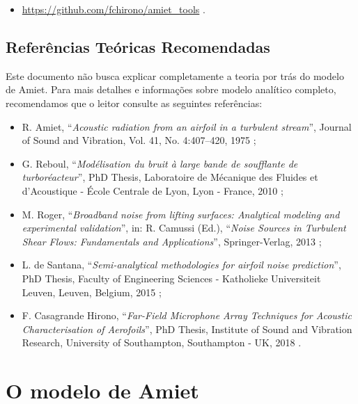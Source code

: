 \documentclass[a4paper, 11pt, twoside]{article}
\begin{document}
\begin{itemize}
	\item \url{https://github.com/fchirono/amiet_tools} .
\end{itemize}


\subsection{Referências Teóricas Recomendadas}

Este documento não busca explicar completamente a teoria por trás do modelo de Amiet. Para mais detalhes e informações sobre modelo analítico completo, recomendamos que o leitor consulte as seguintes referências:

\begin{itemize}
	\item R. Amiet, ``\emph{Acoustic radiation from an airfoil in a turbulent stream}'', Journal of Sound and Vibration, Vol. 41, No. 4:407–420, 1975 \cite{Amiet75};
	
	\item G. Reboul, ``\emph{Modélisation du bruit à large bande de soufflante de turboréacteur}'', PhD Thesis, Laboratoire de Mécanique des Fluides et d’Acoustique - École Centrale de Lyon, Lyon - France, 2010 \cite{Reboul10};
	
	\item M. Roger, ``\emph{Broadband noise from lifting surfaces: Analytical modeling and experimental validation}'', in: R. Camussi (Ed.), ``\emph{Noise Sources in Turbulent Shear Flows: Fundamentals and Applications}'', Springer-Verlag, 2013 \cite{Roger13};
	
	\item L. de Santana, ``\emph{Semi-analytical methodologies for airfoil noise prediction}'', PhD Thesis, Faculty of Engineering Sciences - Katholieke Universiteit Leuven, Leuven, Belgium, 2015 \cite{deSantana2015};
	
	\item F. Casagrande Hirono, ``\emph{Far-Field Microphone Array Techniques for Acoustic Characterisation of Aerofoils}'', PhD Thesis, Institute of Sound and Vibration Research, University of Southampton, Southampton - UK, 2018 \cite{Casagrande18}.
\end{itemize}


\clearpage
\newpage

\section{O modelo de Amiet}
\end{document}
